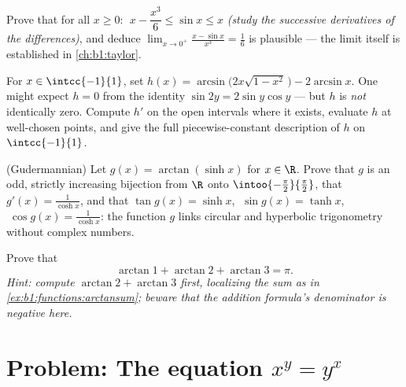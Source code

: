 \begin{exercise}[$\star\star$]\label{exo:b1:functions:9}
Prove that for all $x \geq 0$: $\;x - \dfrac{x^3}{6} \leq \sin x \leq
x$ \emph{(study the successive derivatives of the differences)}, and
deduce $\lim_{x \to 0^+} \frac{x - \sin x}{x^3} = \frac 16$ is
plausible --- the limit itself is established in
\cref{ch:b1:taylor}.
\end{exercise}

\begin{exercise}[$\star\star\star$]\label{exo:b1:functions:10}
For $x \in \intcc{-1}{1}$, set
$h(x) = \arcsin\bigl(2x\sqrt{1 - x^2}\,\bigr) - 2\arcsin x$. One might
expect $h = 0$ from the identity $\sin 2y = 2\sin y\cos y$ --- but
$h$ is \emph{not} identically zero. Compute $h'$ on the open intervals
where it exists, evaluate $h$ at well-chosen points, and give the full
piecewise-constant description of $h$ on $\intcc{-1}{1}$.
\end{exercise}

\begin{exercise}[$\star\star\star$]\label{exo:b1:functions:11}
(Gudermannian) Let $g(x) = \arctan(\sinh x)$ for $x \in \R$. Prove
that $g$ is an odd, strictly increasing bijection from $\R$ onto
$\intoo{-\frac\pi2}{\frac\pi2}$, that $g'(x) = \frac{1}{\cosh x}$,
and that $\tan g(x) = \sinh x$, $\;\sin g(x) = \tanh x$,
$\;\cos g(x) = \frac{1}{\cosh x}$: the function $g$ links circular
and hyperbolic trigonometry without complex numbers.
\end{exercise}

\begin{exercise}[$\star\star$]\label{exo:b1:functions:12}
Prove that
\[
\arctan 1 + \arctan 2 + \arctan 3 = \pi .
\]
\emph{Hint: compute $\arctan 2 + \arctan 3$ first, localizing the
sum as in \cref{ex:b1:functions:arctansum}; beware that the
addition formula's denominator is negative here.}
\end{exercise}

\section{Problem: The equation $x^y = y^x$}

